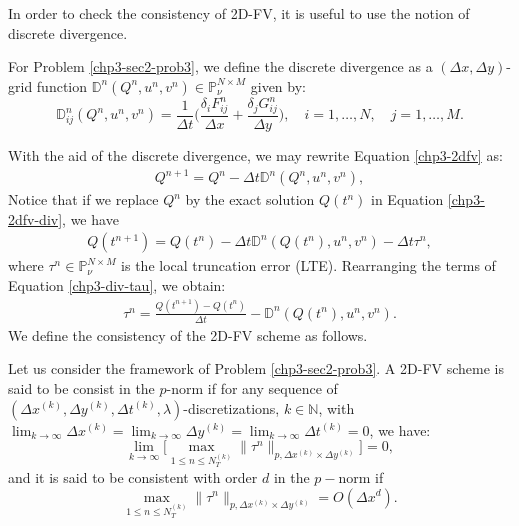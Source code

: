 In order to check the consistency of 2D-FV, it is useful to use the notion of discrete divergence.
\begin{definition}
	\label{chp3-def-div}
	For Problem \ref{chp3-sec2-prob3}, we define the discrete divergence as a 
    $(\Delta x, \Delta y)$-grid function $\mathbb{D}^n(Q^n,u^n,v^n) \in \mathbb{P}^{N\times M}_{\nu}$
	given by:
	\begin{equation}
		\label{chp3-def-div-eq}
		\mathbb{D}_{ij}^n(Q^n,u^n,v^n)=  \frac{1}{\Delta t}
        \bigg(\frac{\delta_i {F}_{ij}^{n}}{\Delta x} + \frac{\delta_j {G}_{ij}^{n}}{\Delta y} \bigg), 
        \quad i = 1, \ldots, N, \quad j=1, \ldots,M.
	\end{equation}
\end{definition}
With the aid of the discrete divergence, we may rewrite Equation \eqref{chp3-2dfv} as:
\begin{align}
    \label{chp3-2dfv-div}
    {Q}^{n+1} =  {Q}^{n} - \Delta t \mathbb{D}^n(Q^n,u^n,v^n),
\end{align}
Notice that if we replace  $Q^n$ by the exact solution $Q(t^n)$ in Equation \eqref{chp3-2dfv-div}, we have
\begin{align}
    \label{chp3-div-tau}
    {Q}(t^{n+1}) =  {Q}(t^{n}) - \Delta t \mathbb{D}^n(Q(t^n),u^n,v^n) - \Delta t \tau^n,
\end{align}
where $\tau^n \in \mathbb{P}^{N\times M}_{\nu}$ is the local truncation error (LTE).
Rearranging the terms of Equation \eqref{chp3-div-tau}, we obtain:
\begin{align}
    \label{chp3-div-tau2}
    \tau^n =  \frac{{Q}(t^{n+1}) - {Q}(t^{n})}{\Delta t} - \mathbb{D}^n(Q(t^n),u^n,v^n).
\end{align}
We define the consistency of the 2D-FV scheme as follows.
\begin{definition}[Consistency]
	\label{chp3-def-cons}
	Let us consider the framework of Problem \ref{chp3-sec2-prob3}.
	A 2D-FV scheme is said to be consist in the $p$-norm if for any sequence of
	$(\Delta x^{(k)},\Delta y^{(k)}, \Delta t^{(k)},\lambda)$-discretizations, 
	$k \in \mathbb{N}$, with
    $\lim_{k\to \infty }{\Delta x^{(k)}} =\lim_{k\to \infty }{\Delta y^{(k)}}= \lim_{k\to \infty }{\Delta t^{(k)}} = 0$, we have:
	\begin{equation*}
		\lim_{k \to \infty}\bigg[ {\max_{1\leq n\leq N_T^{(k)}}}{\|\tau^n\|_{p,\Delta x^{(k)} \times \Delta y^{(k)}}} \bigg] = 0,
	\end{equation*}
	and it is said to be consistent with order $d$ in the $p-$norm if
	\begin{equation*}
		{\max_{1\leq n\leq N_T^{(k)}}}{\|\tau^n\|_{p,\Delta x^{(k)} \times \Delta y^{(k)}}} = O(\Delta x^d).
	\end{equation*}
\end{definition}
